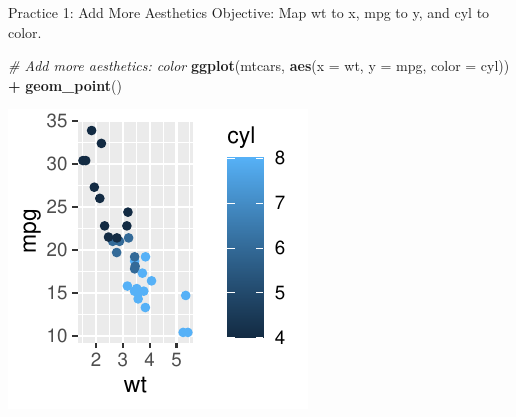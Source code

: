 \documentclass[
  ignorenonframetext,
]{beamer}
\newenvironment{Shaded}{\begin{snugshade}}{\end{snugshade}}
\newcommand{\AttributeTok}[1]{\textcolor[rgb]{0.13,0.29,0.53}{#1}}
\newcommand{\CommentTok}[1]{\textcolor[rgb]{0.56,0.35,0.01}{\textit{#1}}}
\newcommand{\FunctionTok}[1]{\textcolor[rgb]{0.13,0.29,0.53}{\textbf{#1}}}
\newcommand{\NormalTok}[1]{#1}
\newcommand{\SpecialCharTok}[1]{\textcolor[rgb]{0.81,0.36,0.00}{\textbf{#1}}}
\begin{document}
\begin{frame}[fragile]{Practice 1: Add More Aesthetics}
\label{practice-1-add-more-aesthetics}
Objective: Map wt to x, mpg to y, and cyl to color.


\begin{Shaded}
\begin{Highlighting}[]
\CommentTok{\# Add more aesthetics: color}
\FunctionTok{ggplot}\NormalTok{(mtcars, }\FunctionTok{aes}\NormalTok{(}\AttributeTok{x =}\NormalTok{ wt, }\AttributeTok{y =}\NormalTok{ mpg, }\AttributeTok{color =}\NormalTok{ cyl)) }\SpecialCharTok{+} \FunctionTok{geom\_point}\NormalTok{()}
\end{Highlighting}
\end{Shaded}

\begin{center}\includegraphics[width=0.5\linewidth]{Figs/unnamed-chunk-12-1} \end{center}
\end{frame}
\end{document}
